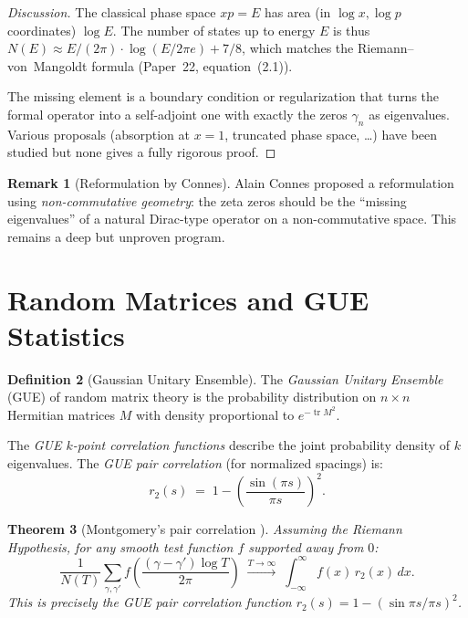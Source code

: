 \documentclass[12pt,a4paper]{amsart}
\newtheorem{theorem}{Theorem}[section]
\theoremstyle{definition}
\newtheorem{definition}[theorem]{Definition}
\newtheorem{remark}[theorem]{Remark}
\DeclareMathOperator{\tr}{tr}
\begin{document}
\begin{proof}[Discussion]
The classical phase space $xp = E$ has area (in $\log x, \log p$ coordinates)
$\log E$.  The number of states up to energy $E$ is thus
$N(E) \approx E/(2\pi) \cdot \log(E/2\pi e) + 7/8$,
which matches the Riemann--von~Mangoldt formula (Paper~22, equation~(2.1)).

The missing element is a boundary condition or regularization that turns
the formal operator into a self-adjoint one with exactly the zeros
$\gamma_n$ as eigenvalues.  Various proposals (absorption at $x=1$,
truncated phase space, \ldots) have been studied but none gives a fully
rigorous proof.
\end{proof}

\begin{remark}[Reformulation by Connes]
Alain Connes \cite{Connes1999} proposed a reformulation using
\emph{non-commutative geometry}: the zeta zeros should be the
``missing eigenvalues'' of a natural Dirac-type operator on a
non-commutative space.  This remains a deep but unproven program.
\end{remark}

\section{Random Matrices and GUE Statistics}
\label{sec:gue}

\begin{definition}[Gaussian Unitary Ensemble]
\label{def:gue}
The \emph{Gaussian Unitary Ensemble} (GUE) of random matrix theory
is the probability distribution on $n \times n$ Hermitian matrices $M$
with density proportional to $e^{-\tr M^2}$.

The \emph{GUE $k$-point correlation functions} describe the joint
probability density of $k$ eigenvalues.  The \emph{GUE pair correlation}
(for normalized spacings) is:
\[
  r_2(s) \;=\; 1 - \left(\frac{\sin(\pi s)}{\pi s}\right)^2.
\]
\end{definition}

\begin{theorem}[Montgomery's pair correlation \cite{Montgomery1973}]
\label{thm:montgomery_gue}
Assuming the Riemann Hypothesis, for any smooth test function $f$
supported away from $0$:
\[
  \frac{1}{N(T)} \sum_{\gamma, \gamma'} f\!\left(\frac{(\gamma-\gamma')\log T}{2\pi}\right)
  \;\xrightarrow{T \to \infty}\;
  \int_{-\infty}^{\infty} f(x)\,r_2(x)\,dx.
\]
This is precisely the GUE pair correlation function $r_2(s) = 1 - (\sin\pi s/\pi s)^2$.
\end{theorem}
\end{document}
